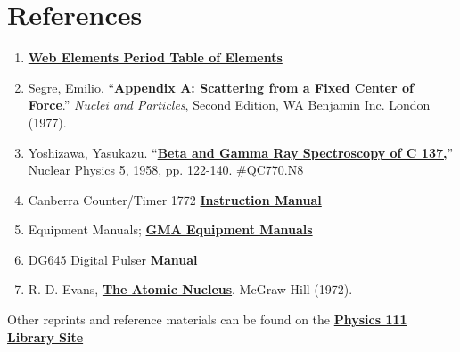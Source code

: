 \documentclass{../lab}
\begin{document}
\section{References}
\label{sec:References}

\begin{enumerate}
    \item \href{http://www.webelements.com}{\textbf{Web Elements Period Table of Elements}}

    \item Segre, Emilio. ``\href{http://physics111.lib.berkeley.edu/Physics111/Reprints/GMA/Scattering\%20From\%20Center\%20appendix\%20a.pdf}{\textbf{Appendix A: Scattering from a Fixed Center of Force}}.'' \emph{Nuclei and Particles}, Second Edition, WA Benjamin Inc. London (1977).
    
    \item Yoshizawa, Yasukazu. ``\href{http://physics111.lib.berkeley.edu/Physics111/Reprints/GMA/betaandgammarayspecofCs137.pdf}{\textbf{Beta and Gamma Ray Spectroscopy of C 137,}}'' Nuclear Physics 5, 1958, pp. 122-140. \#QC770.N8
    
    \item Canberra Counter/Timer 1772 \href{http://physics111.lib.berkeley.edu/Physics111/Reprints/GMA/Canberra\_counter\_1772.pdf}{\textbf{Instruction Manual}}
    
    \item Equipment Manuals; \href{http://physics111.lib.berkeley.edu/Physics111/Equipment\_Manuals/GMA/indexequipGMA.html}{\textbf{GMA Equipment Manuals}}
    
    \item DG645 Digital Pulser  \href{http://physics111.lib.berkeley.edu/Physics111/Equipment_Manuals/GMA/DG645m.pdf}{\textbf{Manual}}
    
    \item R. D. Evans, \href{http://physics111.lib.berkeley.edu/Physics111/Reprints/R.D.Evans\%20Atomic\%20Nucleus/The\%20Atomic\%20Nucleus\%20Evans\%20full\%20text.pdf}{\textbf{The Atomic Nucleus}}. McGraw Hill (1972).
\end{enumerate}

\noindent Other reprints and reference materials can be found on the \href{http://physics111.lib.berkeley.edu/Physics111/Reprints/GMA/GMA\_index.html}{\textbf{Physics 111 Library Site}}
\end{document}
